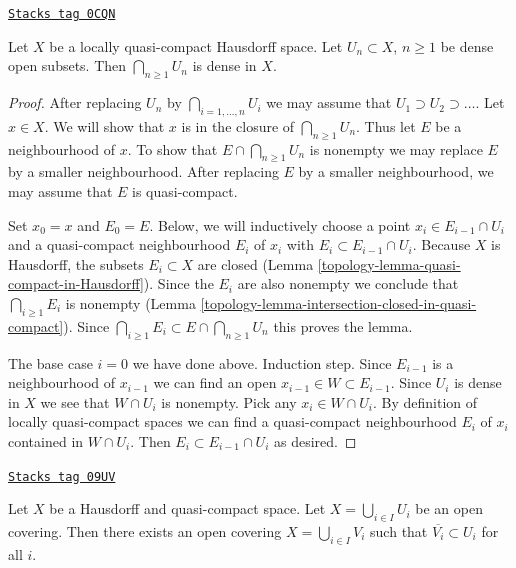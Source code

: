\begin{lemma}

\label{topology-lemma-baire-category-locally-compact}
\href{https://stacks.math.columbia.edu/tag/0CQN}{\texttt{Stacks tag 0CQN}}

Let $X$ be a locally quasi-compact Hausdorff space.
Let $U_n \subset X$, $n \geq 1$ be dense open subsets. Then
$\bigcap_{n \geq 1} U_n$ is dense in $X$.
\end{lemma}

\begin{proof}

After replacing $U_n$ by $\bigcap_{i = 1, \ldots, n} U_i$
we may assume that $U_1 \supset U_2 \supset \ldots$.
Let $x \in X$. We will show that $x$ is in the closure of
$\bigcap_{n \geq 1} U_n$. Thus let $E$ be a neighbourhood of $x$.
To show that $E \cap \bigcap_{n \geq 1} U_n$ is nonempty we
may replace $E$ by a smaller neighbourhood. After replacing
$E$ by a smaller neighbourhood, we may assume that $E$ is quasi-compact.

\medskip\noindent
Set $x_0 = x$ and $E_0 = E$. Below, we will inductively choose
a point $x_i \in E_{i - 1} \cap U_i$ and a quasi-compact
neighbourhood $E_i$ of $x_i$ with $E_i \subset E_{i - 1} \cap U_i$.
Because $X$ is Hausdorff, the subsets $E_i \subset X$ are closed
(Lemma \ref{topology-lemma-quasi-compact-in-Hausdorff}).
Since the $E_i$ are also nonempty we conclude that
$\bigcap_{i \geq 1} E_i$ is nonempty
(Lemma \ref{topology-lemma-intersection-closed-in-quasi-compact}).
Since $\bigcap_{i \geq 1} E_i \subset E \cap \bigcap_{n \geq 1} U_n$
this proves the lemma.

\medskip\noindent
The base case $i = 0$ we have done above. Induction step.
Since $E_{i - 1}$ is a neighbourhood of $x_{i - 1}$ we can
find an open $x_{i - 1} \in W \subset E_{i - 1}$.
Since $U_i$ is dense in $X$
we see that $W \cap U_i$ is nonempty.
Pick any $x_i \in W \cap U_i$.
By definition of locally quasi-compact spaces we can
find a quasi-compact neighbourhood $E_i$ of $x_i$
contained in $W \cap U_i$. Then $E_i \subset E_{i - 1} \cap U_i$
as desired.
\end{proof}

\begin{lemma}
\label{topology-lemma-relatively-compact-refinement}
\href{https://stacks.math.columbia.edu/tag/09UV}{\texttt{Stacks tag 09UV}}

Let $X$ be a Hausdorff and quasi-compact space.
Let $X = \bigcup_{i \in I} U_i$ be an open covering.
Then there exists an open covering $X = \bigcup_{i \in I} V_i$
such that $\overline{V_i} \subset U_i$ for all $i$.
\end{lemma}

